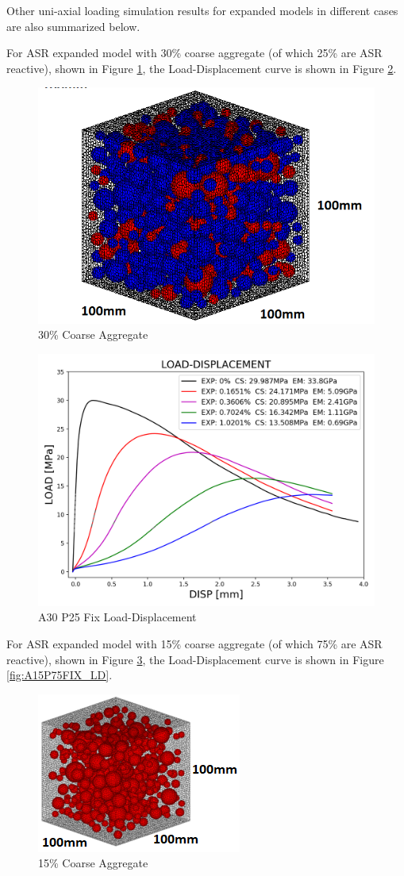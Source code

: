 Other uni-axial loading simulation results for expanded models in different cases are also summarized below.

For ASR expanded model with 30\% coarse aggregate (of which 25\% are ASR reactive), shown in Figure \ref{fig:A30P25_model}, the Load-Displacement curve is shown in Figure \ref{fig:A30P25FIX_LD}.

\begin{figure}[ht]
\centering
\includegraphics[width=.3\linewidth]{Files/Aggregate/A30P25.png}
  \caption{30\% Coarse Aggregate}
  \label{fig:A30P25_model}
\end{figure}

\begin{figure}[ht]
\centering
\includegraphics[width=.8\linewidth]{Files/exp_3D/ASR/S13A30P25FIX-LOAD-DISPLACEMENT.png}
  \caption{A30 P25 Fix Load-Displacement}
  \label{fig:A30P25FIX_LD}
\end{figure}

\clearpage

For ASR expanded model with 15\% coarse aggregate (of which 75\% are ASR reactive), shown in Figure \ref{fig:A15P75_model}, the Load-Displacement curve is shown in Figure \ref{fig:A15P75FIX_LD}.


\begin{figure}[ht]
\centering
\includegraphics[width=.3\linewidth]{Files/Aggregate/A15.png}
  \caption{15\% Coarse Aggregate}
  \label{fig:A15P75_model}
\end{figure}

